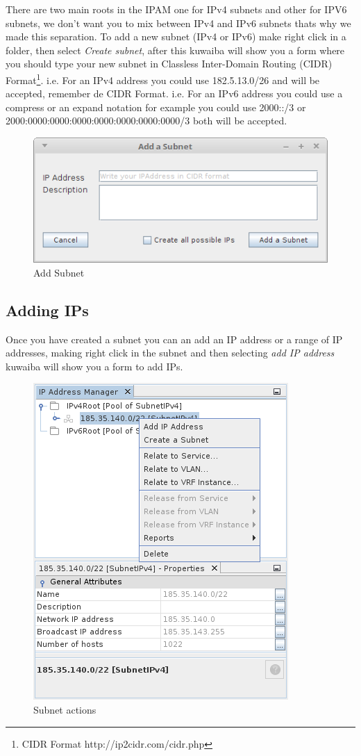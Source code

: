 \documentclass[a4paper]{article}
\begin{document}
		There are two main roots in the IPAM one for IPv4 subnets and other for IPV6 subnets, we don't want you to mix between IPv4 and IPv6 subnets thats why we made this separation.  To add a new subnet (IPv4 or IPv6) make right click in a folder, then select \textit{Create subnet}, after this kuwaiba will show you a form where you should type your new subnet in Classless Inter-Domain Routing (CIDR) Format\footnote{CIDR Format http://ip2cidr.com/cidr.php}.
		\newline i.e. For an IPv4 address you could use 182.5.13.0/26 and will be accepted, remember de CIDR Format. 
		\newline i.e. For an IPv6 address you could use a compress or an expand notation for example you could use 2000::/3 or 2000:0000:0000:0000:0000:0000:0000:0000/3 both will be accepted.
		\begin{figure}[h!]
			\centering
			\includegraphics[width=0.5\linewidth]{img/ipam_add_subnet.png}
			\caption{Add Subnet}
			\label{fig:ipam_add_subnet}
		\end{figure}
		
		\subsection{Adding IPs}
		
		Once you have created a subnet you can an add an IP address or a range of IP addresses, making right click in the subnet and then selecting \textit{add IP address} kuwaiba will show you a form to add IPs.
		\begin{figure}[h!]
			\centering
			\includegraphics[width=0.4\linewidth]{img/ipam_subnet_actions.png}
			\caption{Subnet actions}
			\label{fig:ipam_subnet_actions}
		\end{figure}
		
\end{document}
